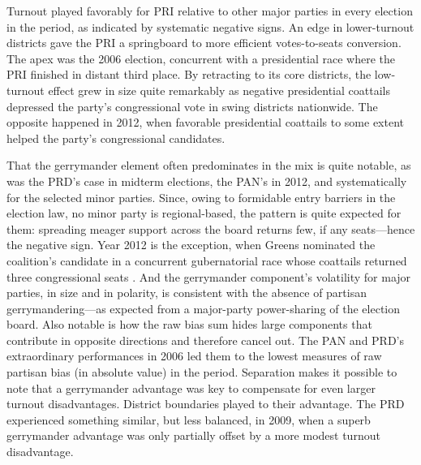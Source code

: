 \documentclass[letter,12pt]{article}
\begin{document}
Turnout played favorably for PRI relative to other major parties in every election in the period, as indicated by systematic negative signs. An edge in lower-turnout districts gave the PRI a springboard to more efficient votes-to-seats conversion. The apex was the 2006 election, concurrent with a presidential race where the PRI finished in distant third place. By retracting to its core districts, the low-turnout effect grew in size quite remarkably as negative presidential coattails depressed the party's congressional vote in swing districts nationwide. The opposite happened in 2012, when favorable presidential coattails to some extent helped the party's congressional candidates.

That the gerrymander element often predominates in the mix is quite notable, as was the PRD's case in midterm elections, the PAN's in 2012, and systematically for the selected minor parties. Since, owing to formidable entry barriers in the election law, no minor party is regional-based, the pattern is quite expected for them: spreading meager support across the board returns few, if any seats---hence the negative sign. Year 2012 is the exception, when Greens nominated the coalition's candidate in a concurrent gubernatorial race whose coattails returned three congressional seats \citep{magar.gubCoatMx.2012}. And the gerrymander component's volatility for major parties, in size and in polarity, is consistent with the absence of partisan gerrymandering---as expected from a major-party power-sharing of the election board. Also notable is how the raw bias sum hides large components that contribute in opposite directions and therefore cancel out. The PAN and PRD's extraordinary performances in 2006 led them to the lowest measures of raw partisan bias (in absolute value) in the period. Separation makes it possible to note that a gerrymander advantage was key to compensate for even larger turnout disadvantages. District boundaries played to their advantage. The PRD experienced something similar, but less balanced, in 2009, when a superb gerrymander advantage was only partially offset by a more modest turnout disadvantage. 
\end{document}
